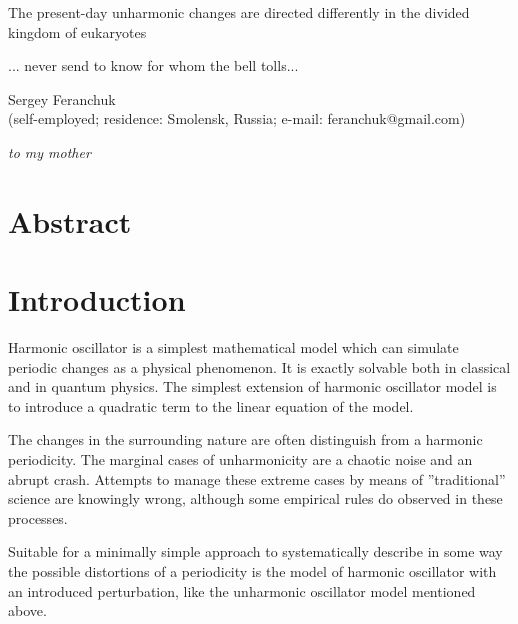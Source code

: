 \documentclass[a4paper]{article}
\begin{document}
{\Large{The present-day unharmonic changes are directed differently in the divided kingdom of eukaryotes}}

{ \small{... never send to know for whom the bell tolls...} }

Sergey Feranchuk \\{\small(self-employed; residence: Smolensk, Russia; e-mail: feranchuk@gmail.com)}

\begin{flushright}
\small{ \textit{to my mother}}
\end{flushright}

\section*{Abstract}


\clearpage

\section*{Introduction}

Harmonic oscillator is a simplest mathematical model which can simulate periodic changes as a physical phenomenon. It is exactly solvable both in classical and in quantum physics. The simplest extension of harmonic oscillator model is to introduce a quadratic term to the linear equation of the model. 

The changes in the surrounding nature are often distinguish from a harmonic periodicity. The marginal cases of unharmonicity are a chaotic noise and an abrupt crash. Attempts to manage these extreme cases by means of ''traditional'' science are knowingly wrong, although some empirical rules do observed in these processes.

Suitable for a minimally simple approach to systematically describe in some way the possible distortions of a periodicity is the model of harmonic oscillator with an introduced perturbation, like the unharmonic oscillator model mentioned above. 
\end{document}
